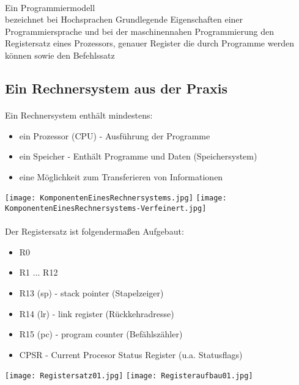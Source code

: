 		\paragraph{} Ein Programmiermodell \\ bezeichnet bei Hochsprachen Grundlegende Eigenschaften
		einer Programmiersprache und bei der maschinennahen Programmierung den Registersatz eines
		Prozessors, genauer Register die durch Programme werden können sowie den Befehlssatz


	\subsection{Ein Rechnersystem aus der Praxis}
		\paragraph{} Ein Rechnersystem enthält mindestens:
		\begin{itemize}
			\item ein Prozessor (CPU) - Ausführung der Programme
			\item ein Speicher - Enthält Programme und Daten (Speichersystem)
			\item eine Möglichkeit zum Transferieren von Informationen
		\end{itemize}
		\begin{center}
			\texttt{[image: KomponentenEinesRechnersystems.jpg]}
			\texttt{[image: KomponentenEinesRechnersystems-Verfeinert.jpg]}
		\end{center}

		\paragraph{} Der Registersatz ist folgenderma\ss en Aufgebaut:
		\begin{itemize}
			\item R0
			\item R1 ... R12
			\item R13 (sp) - stack pointer (Stapelzeiger)
			\item R14 (lr) - link register (Rückkehradresse)
			\item R15 (pc) - program counter (Befählszähler)
			\item CPSR - Current Procesor Status Register (u.a. Statusflags)
		\end{itemize}
		\begin{center}
			\texttt{[image: Registersatz01.jpg]}
			\texttt{[image: Registeraufbau01.jpg]}
		\end{center}


